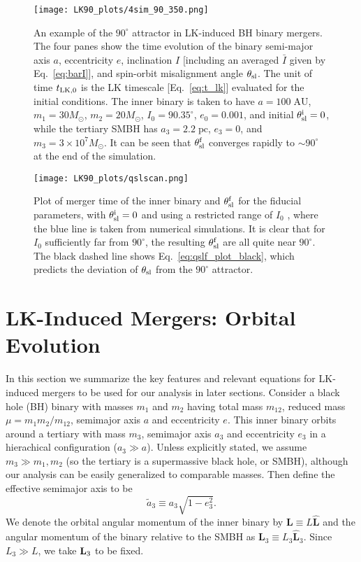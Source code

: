 \documentclass[
        twocolumn,
        twocolappendix
    ]{aastex63}
\renewcommand*{\bm}[1]{\boldsymbol{\mathbf{#1}}}
\newcommand*{\uv}[1]{\hat{\bm{#1}}}
\begin{document}
\begin{figure}
    \centering
    \texttt{[image: LK90\_plots/4sim\_90\_350.png]}
    \caption{An example of the $90^\circ$ attractor in LK-induced BH binary
    mergers. The four panes show the time evolution of the binary semi-major
    axis $a$, eccentricity $e$, inclination $I$ [including an averaged $\bar{I}$
    given by Eq.~\eqref{eq:barI}], and spin-orbit misalignment angle
    $\theta_{\rm sl}$. The unit of time $t_{\rm LK, 0}$ is the LK timescale
    [Eq.~\eqref{eq:t_lk}] evaluated for the initial conditions. The inner binary
    is taken to have $a = 100\;\mathrm{AU}$, $m_1 = 30M_{\odot}$, $m_2 =
    20M_{\odot}$, $I_0 = 90.35^\circ$, $e_0 = 0.001$, and initial $\theta_{\rm
    sl}^{\rm i} = 0$, while the tertiary SMBH has $a_3 = 2.2\;\mathrm{pc}$, $e_3
    = 0$, and $m_3 = 3 \times 10^7 M_{\odot}$. It can be seen that $\theta_{\rm
    sl}^{\rm f}$ converges rapidly to $\sim 90^\circ$ at the end of the
    simulation.}\label{fig:4sim_90_350}
\end{figure}
\begin{figure}
    \centering
    \texttt{[image: LK90\_plots/qslscan.png]}
    \caption{Plot of merger time of the inner binary and $\theta_{\rm sl}^{\rm
    f}$ for the fiducial parameters, with $\theta_{\rm sl}^{\rm i} = 0$ and
    using a restricted range of $I_0$ \citep[analogous to the bottom-most panel
    in Fig.~3 of][]{bin2}, where the blue line is taken from numerical
    simulations. It is clear that for $I_0$ sufficiently far from $90^\circ$,
    the resulting $\theta_{\rm sl}^{\rm f}$ are all quite near $90^\circ$. The
    black dashed line shows Eq.~\eqref{eq:qslf_plot_black}, which predicts the
    deviation of $\theta_{\rm sl}$ from the $90^\circ$
    attractor.}\label{fig:qslscan}
\end{figure}

\section{LK-Induced Mergers: Orbital Evolution}\label{s:setup_orbital}

In this section we summarize the key features and relevant equations for
LK-induced mergers to be used for our analysis in later sections. Consider a
black hole (BH) binary with masses $m_1$ and $m_2$ having total mass $m_{12}$,
reduced mass $\mu = m_1 m_2 / m_{12}$, semimajor axis $a$ and eccentricity $e$.
This inner binary orbits around a tertiary with mass $m_3$, semimajor axis $a_3$
and eccentricity $e_3$ in a hierachical configuration ($a_3\gg a$). Unless
explicitly stated, we assume $m_3 \gg m_1, m_2$ (so the tertiary is a
supermassive black hole, or SMBH), although our analysis can be easily
generalized to comparable masses. Then define the effective semimajor axis to be
\begin{equation}
    \tilde{a}_3 \equiv a_3\sqrt{1 - e_3^2}.
\end{equation}
We denote the orbital angular momentum of the inner binary by $\bm{L} \equiv L
\uv{L}$ and the angular momentum of the binary relative to the SMBH as $\bm{L}_3
\equiv L_3 \uv{L}_3$. Since $L_3 \gg L$, we take $\bm{L}_{\rm 3}$ to be fixed.
\end{document}
